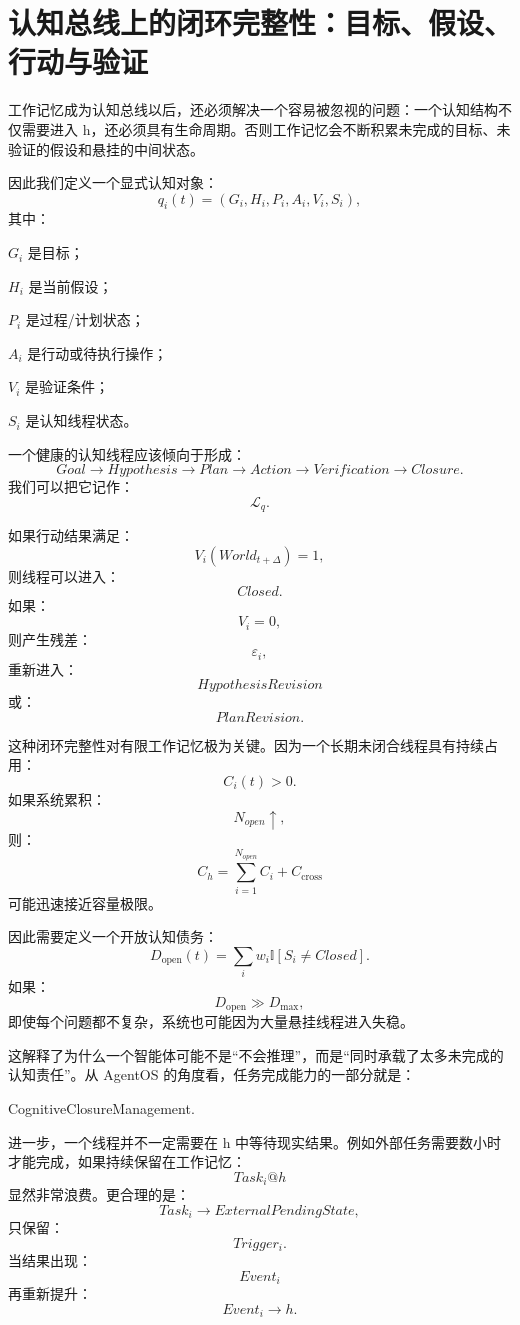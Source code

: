 \section{认知总线上的闭环完整性：目标、假设、行动与验证}

工作记忆成为认知总线以后，还必须解决一个容易被忽视的问题：一个认知结构不仅需要进入 h，还必须具有生命周期。否则工作记忆会不断积累未完成的目标、未验证的假设和悬挂的中间状态。

因此我们定义一个显式认知对象：
\[
q_i(t)
=
\left(
G_i,
H_i,
P_i,
A_i,
V_i,
S_i
\right),
\]
其中：

$G_i$ 是目标；

$H_i$ 是当前假设；

$P_i$ 是过程/计划状态；

$A_i$ 是行动或待执行操作；

$V_i$ 是验证条件；

$S_i$ 是认知线程状态。

一个健康的认知线程应该倾向于形成：
\[
Goal
\rightarrow
Hypothesis
\rightarrow
Plan
\rightarrow
Action
\rightarrow
Verification
\rightarrow
Closure.
\]
我们可以把它记作：
\[
\mathcal L_q.
\]

如果行动结果满足：
\[
V_i(World_{t+\Delta})=1,
\]
则线程可以进入：
\[
Closed.
\]
如果：
\[
V_i=0,
\]
则产生残差：
\[
\varepsilon_i,
\]
重新进入：
\[
HypothesisRevision
\]
或：
\[
PlanRevision.
\]

这种闭环完整性对有限工作记忆极为关键。因为一个长期未闭合线程具有持续占用：
\[
C_i(t)>0.
\]
如果系统累积：
\[
N_{open}\uparrow,
\]
则：
\[
C_h
=
\sum_{i=1}^{N_{open}}C_i
+
C_{\mathrm{cross}}
\]
可能迅速接近容量极限。

因此需要定义一个开放认知债务：
\[
D_{\mathrm{open}}(t)
=
\sum_i
w_i
\mathbb I[S_i\neq Closed].
\]
如果：
\[
D_{\mathrm{open}}\gg D_{\max},
\]
即使每个问题都不复杂，系统也可能因为大量悬挂线程进入失稳。

这解释了为什么一个智能体可能不是“不会推理”，而是“同时承载了太多未完成的认知责任”。从 AgentOS 的角度看，任务完成能力的一部分就是：
\begin{statementbox}
CognitiveClosureManagement.
\end{statementbox}

进一步，一个线程并不一定需要在 h 中等待现实结果。例如外部任务需要数小时才能完成，如果持续保留在工作记忆：
\[
Task_i@h
\]
显然非常浪费。更合理的是：
\[
Task_i
\rightarrow
ExternalPendingState,
\]
只保留：
\[
Trigger_i.
\]
当结果出现：
\[
Event_i
\]
再重新提升：
\[
Event_i\rightarrow h.
\]

